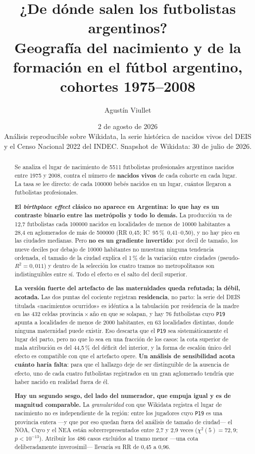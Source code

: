 \documentclass[11pt,a4paper]{article}
\title{\bfseries ¿De dónde salen los futbolistas argentinos?\\[0.35em]
\large Geografía del nacimiento y de la formación en el fútbol argentino,\\
cohortes 1975--2008}
\author{Agustín Viullet}
\date{2 de agosto de 2026\\[0.4em]
\footnotesize Análisis reproducible sobre Wikidata, la serie histórica de nacidos
vivos del DEIS\\ y el Censo Nacional 2022 del INDEC. Snapshot de Wikidata:
30 de julio de 2026.}
\newcommand{\ic}[2]{\mbox{IC 95\,\% #1--#2}}
\begin{document}
\maketitle

\begin{abstract}
\noindent
Se analiza el lugar de nacimiento de \num{5511} futbolistas profesionales
argentinos nacidos entre 1975 y 2008, contra el número de \textbf{nacidos vivos}
de cada cohorte en cada lugar. La tasa se lee directo: de cada \num{100000} bebés
nacidos en un lugar, cuántos llegaron a futbolistas profesionales.

\textbf{El \emph{birthplace effect} clásico no aparece en Argentina: lo que hay es
un contraste binario entre las metrópolis y todo lo demás.} La producción va de
12,7 futbolistas cada \num{100000} nacidos en localidades de menos de \num{10000}
habitantes a 28,4 en aglomerados de más de \num{500000} (RR 0,45;
\ic{0,41}{0,50}), y no hay pico en las ciudades medianas. Pero \textbf{no es un
gradiente invertido}: por decil de tamaño, los nueve deciles por debajo de
\num{10000} habitantes no muestran ninguna tendencia ordenada, el tamaño de la
ciudad explica el 1\,\% de la variación entre ciudades
(pseudo-$R^2 = 0{,}011$) y dentro de la selección los cuatro tramos no
metropolitanos son indistinguibles entre sí. Todo el efecto es el salto del decil
superior.

\textbf{La versión fuerte del artefacto de las maternidades queda refutada; la
débil, acotada.} Las dos puntas del cociente registran \textbf{residencia}, no
parto: la serie del DEIS titulada «nacimientos ocurridos» es idéntica a la
tabulación por residencia de la madre en las 432 celdas
provincia\,$\times$\,año en que se solapan, y hay 76 futbolistas cuyo
\texttt{P19} apunta a localidades de menos de \num{2000} habitantes, en 63
localidades distintas, donde ninguna maternidad puede existir. Eso descarta que
el \texttt{P19} sea sistemáticamente el lugar del parto, pero no que lo sea en
una fracción de los casos: la cota superior de mala atribución es del 44,5\,\%
del déficit del interior, y la forma de escalón único del efecto es compatible
con que el artefacto opere. \textbf{Un análisis de sensibilidad acota cuánto
haría falta}: para que el hallazgo deje de ser distinguible de la ausencia de
efecto, uno de cada cuatro futbolistas registrados en un gran aglomerado tendría
que haber nacido en realidad fuera de él.

\textbf{Hay un segundo sesgo, del lado del numerador, que empuja igual y es de
magnitud comparable.} La \emph{granularidad} con que Wikidata registra el lugar
de nacimiento no es independiente de la región: entre los jugadores cuyo
\texttt{P19} es una provincia entera —y que por eso quedan fuera del análisis de
tamaño de ciudad— el NOA, Cuyo y el NEA están sobrerrepresentados entre 2,7 y 2,9
veces ($\chi^2(5) = 72{,}9$; $p < 10^{-13}$). Atribuir los 486 casos excluidos al
tramo menor —una cota deliberadamente inverosímil— llevaría su RR de 0,45 a 0,96.


\end{abstract}
\end{document}
